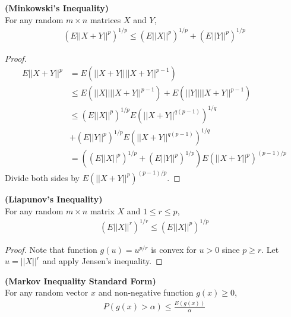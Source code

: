 \documentclass[11pt]{article} %
\theoremstyle{definition}
\numberwithin{defn}{subsection}
\numberwithin{thm}{subsection}
\numberwithin{ex}{subsection}
\newcommand{\bb}[1]{\mathbb{#1}}
\newcommand{\R}{\bb{R}}
\begin{document}

\begin{thm}\label{thm:minkowski'sineq}
	\textbf{(Minkowski's Inequality)}\\
	For any random $m\times n$ matrices $X$ and $Y$,
	\begin{align*}
	(E||X+Y||^p)^{1/p}\le(E||X||^p)^{1/p}+(E||Y||^p)^{1/p}
	\end{align*}	
	\begin{proof}
		\begin{align*}
		E||X+Y||^p&=E(||X+Y||||X+Y||^{p-1})\\
		&\le E(||X||||X+Y||^{p-1})+E(||Y||||X+Y||^{p-1})\\
		&\le (E||X||^p)^{1/p}E(||X+Y||^{q(p-1)})^{1/q}\\
		&+(E||Y||^p)^{1/p}E(||X+Y||^{q(p-1)})^{1/q}\\
		&=((E||X||^p)^{1/p}+(E||Y||^p)^{1/p})E(||X+Y||^p)^{(p-1)/p}
		\end{align*}
		Divide both sides by $E(||X+Y||^p)^{(p-1)/p}.$
	\end{proof}
\end{thm}

\begin{thm}\label{thm:liapunovsineq}
	\textbf{(Liapunov's Inequality)}\\
	For any random $m \times n$ matrix $X$ and $1\le r\le p$,
	\begin{align*}
	(E||X||^r)^{1/r}\le (E||X||^p)^{1/p}
	\end{align*}	
	\begin{proof}
		Note that function $g(u)=u^{p/r}$ is convex for $u>0$ since $p\ge r$. Let $u=||X||^r$ and apply Jensen's inequality.
	\end{proof}
\end{thm}

\begin{thm}\label{thm:markoveineq}
	\textbf{(Markov Inequality Standard Form)}\\
	For any random vector $x$ and non-negative function $g(x)\ge 0$,
	\begin{align*}
	P(g(x)>\alpha)\le\frac{E(g(x))}{\alpha}
	\end{align*}
\end{thm}
\end{document}
